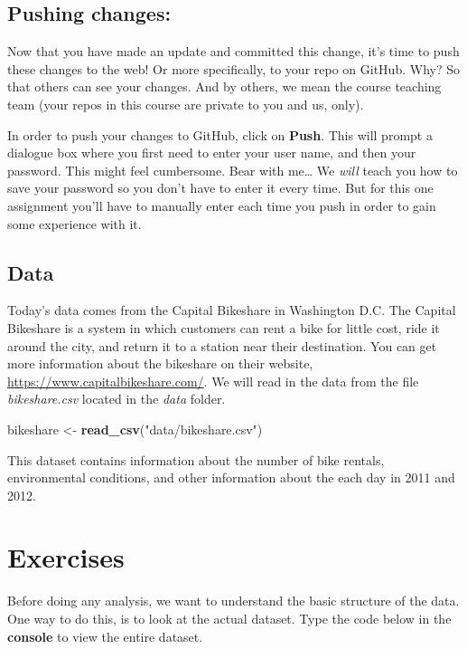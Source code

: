\documentclass[]{book}
\newenvironment{Shaded}{\begin{snugshade}}{\end{snugshade}}
\newcommand{\KeywordTok}[1]{\textcolor[rgb]{0.13,0.29,0.53}{\textbf{#1}}}
\newcommand{\StringTok}[1]{\textcolor[rgb]{0.31,0.60,0.02}{#1}}
\newcommand{\NormalTok}[1]{#1}
\begin{document}
\subsection{Pushing changes:}\label{pushing-changes}

Now that you have made an update and committed this change, it's time to
push these changes to the web! Or more specifically, to your repo on
GitHub. Why? So that others can see your changes. And by others, we mean
the course teaching team (your repos in this course are private to you
and us, only).

In order to push your changes to GitHub, click on \textbf{Push}. This
will prompt a dialogue box where you first need to enter your user name,
and then your password. This might feel cumbersome. Bear with me\ldots{}
We \emph{will} teach you how to save your password so you don't have to
enter it every time. But for this one assignment you'll have to manually
enter each time you push in order to gain some experience with it.

\subsection{Data}\label{data}

Today's data comes from the Capital Bikeshare in Washington D.C. The
Capital Bikeshare is a system in which customers can rent a bike for
little cost, ride it around the city, and return it to a station near
their destination. You can get more information about the bikeshare on
their website, \url{https://www.capitalbikeshare.com/}. We will read in
the data from the file \emph{bikeshare.csv} located in the \emph{data}
folder.

\begin{Shaded}
\begin{Highlighting}[]
\NormalTok{bikeshare <-}\StringTok{ }\KeywordTok{read_csv}\NormalTok{(}\StringTok{"data/bikeshare.csv"}\NormalTok{)}
\end{Highlighting}
\end{Shaded}

This dataset contains information about the number of bike rentals,
environmental conditions, and other information about the each day in
2011 and 2012.

\section{Exercises}\label{exercises}

Before doing any analysis, we want to understand the basic structure of
the data. One way to do this, is to look at the actual dataset. Type the
code below in the \textbf{console} to view the entire dataset.
\end{document}
